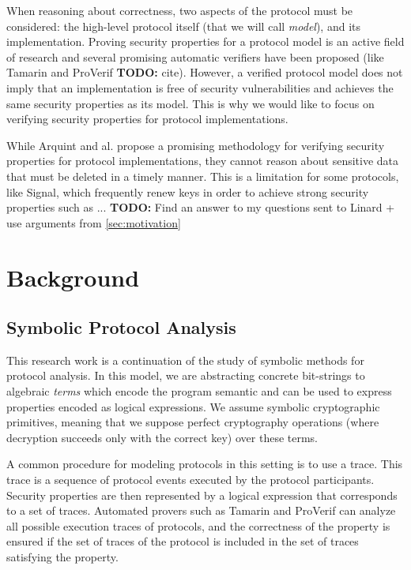 \documentclass{article}
\newcommand{\TODO}[1]{\textcolor{RedViolet}{\textbf{TODO:} #1}}
\begin{document}
When reasoning about correctness, two aspects of the protocol must be considered: the high-level protocol itself (that we will call \textit{model}), and its implementation. Proving security properties for a protocol model is an active field of research and several promising automatic verifiers have been proposed (like Tamarin and ProVerif \TODO{cite}). However, a verified protocol model does not imply that an implementation is free of security vulnerabilities and achieves the same security properties as its model. This is why we would like to focus on verifying security properties for protocol implementations.

While Arquint and al.\cite{arquint2022generic} propose a promising methodology for verifying security properties for protocol implementations, they cannot reason about sensitive data that must be deleted in a timely manner. This is a limitation for some protocols, like Signal\cite{marlinspike2016x3dh}, which frequently renew keys in order to achieve strong security properties such as ...
\TODO{Find an answer to my questions sent to Linard + use arguments from \ref*{sec:motivation}}

\section{Background}

\subsection{Symbolic Protocol Analysis}

This research work is a continuation of the study of symbolic methods for protocol analysis. In this model, we are abstracting concrete bit-strings to algebraic \textit{terms} which encode the program semantic and can be used to express properties encoded as logical expressions.
We assume symbolic cryptographic primitives, meaning that we suppose perfect cryptography operations (where decryption succeeds only with the correct key) over these terms.

A common procedure for modeling protocols in this setting is to use a trace. This trace is a sequence of protocol events executed by the protocol participants. Security properties are then represented by a logical expression that corresponds to a set of traces. Automated provers such as Tamarin and ProVerif can analyze all possible execution traces of protocols, and the correctness of the property is ensured if the set of traces of the protocol is included in the set of traces satisfying the property.
\end{document}
